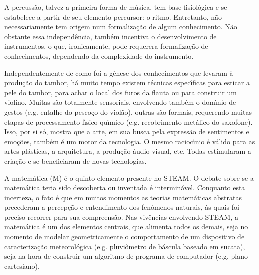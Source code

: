 \documentclass[
12pt,		%
openright,	%
twoside,  %
a4paper,			%
chapter=TITLE,		%
english,			%
french,				%
spanish,			%
brazil				%
]{USPSC-classe/USPSC}
\begin{document}
A percuss\~ao, talvez a primeira forma de m\'usica, tem base fisiol\'ogica e se estabelece a partir de seu elemento percursor: o ritmo. Entretanto, n\~ao necessariamente tem origem num formaliza\c{c}\~ao de algum conhecimento. N\~ao obstante essa independ\^encia, tamb\'em incentiva o desenvolvimento de instrumentos, o que, ironicamente, pode requerera formaliza\c{c}\~ao de conhecimentos, dependendo da complexidade do instrumento.










Independentemente de como foi a g\^enese dos conhecimentos que levaram \`a produ\c{c}\~ao do tambor, h\'a muito tempo existem t\'ecnicas espec\'{\i}ficas para esticar a pele do tambor, para achar o local dos furos da flauta ou para construir um violino. Muitas s\~ao totalmente sensoriais, envolvendo tamb\'em o dom\'{\i}nio de gestos (e.g. entalhe do pesco\c{c}o do viol\~ao), outras s\~ao formais, requerendo muitas etapas de processamento f\'{\i}sico-qu\'{\i}mico (e.g. recobrimento met\'alico do saxofone). Isso, por si s\'o, mostra que a arte, em sua busca pela express\~ao de sentimentos e emo\c{c}\~oes, tamb\'em \'e um motor da tecnologia. O mesmo racioc\'{\i}nio \'e v\'alido para as artes pl\'asticas, a arquitetura, a produ\c{c}\~ao \'audio-visual, etc. Todas estimularam a cria\c{c}\~ao e se beneficiaram de novas tecnologias.










A matem\'atica (M) \'e o quinto elemento presente no STEAM. O debate sobre se a matem\'atica teria sido descoberta ou inventada \'e intermin\'avel. Conquanto esta incerteza, o fato \'e que em muitos momentos as teorias matem\'aticas abstratas precederam a percep\c{c}\~ao e entendimento dos fen\^omenos naturais, \`as quais foi preciso recorrer para sua compreens\~ao. Nas viv\^encias envolvendo STEAM, a matem\'atica \'e um dos elementos centrais, que alimenta todos os demais, seja no momento de modelar geometricamente o comportamento de um dispositivo de caracteriza\c{c}\~ao meteorol\'ogica (e.g. pluvi\^ometro de b\'ascula baseado em sucata), seja na hora de construir um algoritmo de programa de computador (e.g. plano cartesiano).
\end{document}
